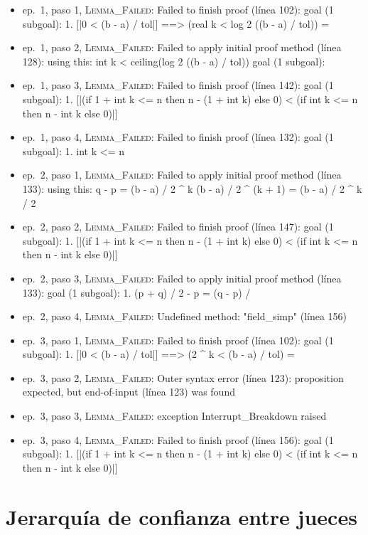 \documentclass[11pt,a4paper]{article}
\begin{document}
\begin{itemize}
  \item ep.~1, paso 1, \textsc{Lemma\_Failed}: Failed to finish proof (línea 102): goal (1 subgoal): 1. [|0 < (b - a) / tol|] ==> (real k < log 2 ((b - a) / tol)) =
  \item ep.~1, paso 2, \textsc{Lemma\_Failed}: Failed to apply initial proof method (línea 128): using this: int k < ceiling(log 2 ((b - a) / tol)) goal (1 subgoal):
  \item ep.~1, paso 3, \textsc{Lemma\_Failed}: Failed to finish proof (línea 142): goal (1 subgoal): 1. [|(if 1 + int k <= n then n - (1 + int k) else 0) < (if int k <= n then n - int k else 0)|]
  \item ep.~1, paso 4, \textsc{Lemma\_Failed}: Failed to finish proof (línea 132): goal (1 subgoal): 1. int k <= n
  \item ep.~2, paso 1, \textsc{Lemma\_Failed}: Failed to apply initial proof method (línea 133): using this: q - p = (b - a) / 2 \textasciicircum{} k (b - a) / 2 \textasciicircum{} (k + 1) = (b - a) / 2 \textasciicircum{} k / 2
  \item ep.~2, paso 2, \textsc{Lemma\_Failed}: Failed to finish proof (línea 147): goal (1 subgoal): 1. [|(if 1 + int k <= n then n - (1 + int k) else 0) < (if int k <= n then n - int k else 0)|]
  \item ep.~2, paso 3, \textsc{Lemma\_Failed}: Failed to apply initial proof method (línea 133): goal (1 subgoal): 1. (p + q) / 2 - p = (q - p) /
  \item ep.~2, paso 4, \textsc{Lemma\_Failed}: Undefined method: "field\_simp" (línea 156)
  \item ep.~3, paso 1, \textsc{Lemma\_Failed}: Failed to finish proof (línea 102): goal (1 subgoal): 1. [|0 < (b - a) / tol|] ==> (2 \textasciicircum{} k < (b - a) / tol) =
  \item ep.~3, paso 2, \textsc{Lemma\_Failed}: Outer syntax error (línea 123): proposition expected, but end-of-input (línea 123) was found
  \item ep.~3, paso 3, \textsc{Lemma\_Failed}: exception Interrupt\_Breakdown raised
  \item ep.~3, paso 4, \textsc{Lemma\_Failed}: Failed to finish proof (línea 156): goal (1 subgoal): 1. [|(if 1 + int k <= n then n - (1 + int k) else 0) < (if int k <= n then n - int k else 0)|]
\end{itemize}

\section{Jerarquía de confianza entre jueces}
\end{document}
